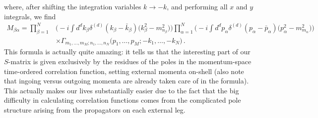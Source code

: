 \documentclass{article}
\numberwithin{equation}{subsection}
\begin{document}
where, after shifting the integration variables $k\to -k$, and performing all $x$ and $y$ integrals, we find
\begin{equation}\begin{split}\label{eq:momLSZ}
	M_{\beta\alpha} = \prod_{\beta = 1}^N&\Bigg(-i\int d^d k_\beta \delta^{(d)}(k_\beta - \bar{k}_\beta)\big(k_\beta^2 - m_{n_\beta}^2\big)\Bigg)
		\prod_{\alpha = 1}^N\Bigg(-i\int d^d p_\alpha \delta^{(d)}(p_\alpha - \bar{p}_\alpha)\big(p_\alpha^2 - m_{m_\alpha}^2\big)\Bigg)\\[0.5em]
		&\times \Gamma_{m_1,\dots,m_M;n_1,\dots,n_N}\big(p_1,\dots,p_M;-k_1,\dots,-k_N\big)\,.
\end{split}\end{equation}
This formula is actually quite amazing: it tells us that the interesting part of our $S$-matrix is given exclusively by the residues of the poles in the
momentum-space time-ordered correlation function, setting external momenta on-shell (also note that ingoing versus outgoing momenta are already
taken care of in the formula). This actually makes our lives substantially easier due to the fact that
the big difficulty in calculating correlation functions comes from the complicated pole structure arising from the propagators on each external leg.
\end{document}
